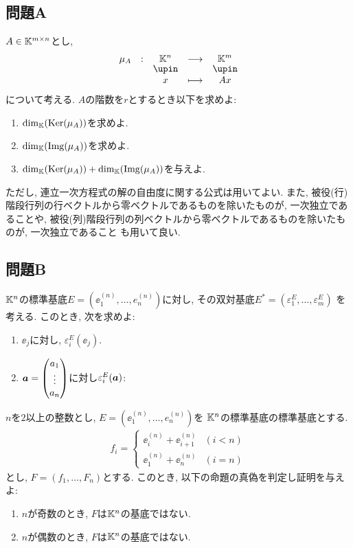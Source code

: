 \subsection{問題A}
\begin{quiz}
  $A\in\mathbb{K}^{m\times n}$とし,
  \begin{align*}
    \shazo{\mu_A}{\KK^n}{\KK^m}
    {x}{Ax}
  \end{align*}
  について考える.
  $A$の階数を$r$とするとき以下を求めよ:
  \begin{enumerate}
  \item $\dim_{\mathbb{K}}(\operatorname{Ker}(\mu_A))$を求めよ.
  \item $\dim_{\mathbb{K}}(\operatorname{Img}(\mu_A))$を求めよ.
  \item $\dim_{\mathbb{K}}(\operatorname{Ker}(\mu_A))+\dim_{\mathbb{K}}(\operatorname{Img}(\mu_A))$を与えよ.
  \end{enumerate}
  ただし,
  連立一次方程式の解の自由度に関する公式は用いてよい.
  また,
  被役(行)階段行列の行ベクトルから零ベクトルであるものを除いたものが,
  一次独立であることや,
  被役(列)階段行列の列ベクトルから零ベクトルであるものを除いたものが,
  一次独立であること
  も用いて良い.
\end{quiz}



\subsection{問題B}
\begin{quiz}
  $\mathbb{K}^n$の標準基底$E=(\ee^{(n)}_1,\ldots,e^{(n)}_n)$に対し,
  その双対基底$E^\ast=(\varepsilon_1^{E},\ldots,\varepsilon_m^{E})$
  を考える.
  このとき, 次を求めよ:
  \begin{enumerate}
    \item $\ee_j$に対し, $\varepsilon_i^{E}(\ee_j)$.
    \item $\boldsymbol{a}=\begin{pmatrix}a_1\\\vdots\\a_n\end{pmatrix}$に対し$\varepsilon_i^{E}(\boldsymbol{a})$:
  \end{enumerate}
\end{quiz}

\begin{quiz}
  $n$を$2$以上の整数とし,
  $E=(\ee^{(n)}_1,\ldots,e^{(n)}_n)$を
  $\mathbb{K}^n$の標準基底の標準基底とする.
  \begin{align*}
    f_i =
    \begin{cases}
      \ee^{(n)}_i+\ee^{(n)}_{i+1} &(i<n)\\
      \ee^{(n)}_1+\ee^{(n)}_n&(i=n)
    \end{cases}
  \end{align*}
  とし,
  $F=(f_1,\ldots,F_n)$とする.
  このとき,
  以下の命題の真偽を判定し証明を与えよ:  
  \begin{enumerate}
    \item $n$が奇数のとき, $F$は$\mathbb{K}^n$の基底ではない.
    \item $n$が偶数のとき, $F$は$\mathbb{K}^n$の基底ではない.
  \end{enumerate}
\end{quiz}

